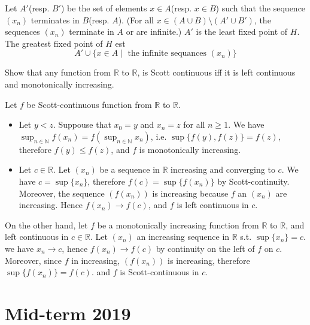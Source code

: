 \documentclass[a4paper,11pt]{exam}
\newcommand{\N}{\mathbb{N}}
\newcommand{\R}{\mathbb{R}}
\begin{document}
\begin{questions}
\begin{solution}
			Let $A'$(resp.  $B'$) be the set of elements $x\in A$(resp.  $x\in B$) such that the sequence $(x_n)$ terminates in $B$(resp.  $A$). 
			(For all $x \in (A \cup B) \setminus (A' \cup B')$, the sequences $(x_n)$
			terminate in $A$ or are infinite.)
			$A'$ is the least fixed point of $H$.
			The greatest fixed point of $H$ est
			\[
			A' \cup \{ x \in A \mid \text{ the
				infinite sequances $(x_n)$}  \}
			\]
		\end{solution}
		
		
		\question
		Show that any function from $\R$ to $\R$, is Scott continuous iff it is left continuous and monotonically increasing.
		\begin{solution}
			Let $f$ be Scott-continuous function from $\R$ to $\R$.
			\begin{itemize}
				\item Let $y<z$. Suppouse that $x_0=y$ and $x_n=z$ for all $n \geq  1$.
				We have $\sup_{n \in \N}f(x_n) = f(\sup_{n \in\N}x_n)$, i.e. $\sup\{f(y),f(z)\} = f(z)$, therefore $f(y) \leq f(z)$, and	$f$ is monotonically increasing.
				\item Let $c\in\R$. Let $(x_n)$ be a sequence in $\R$ increasing and converging to $c$.
				We have $c = \sup \{ x_n \}$, therefore $f(c) = \sup \{ f(x_n) \}$ by Scott-continuity.
				Moreover, the sequence $(f(x_n))$ is increasing because $f$ an $(x_n)$ are increasing. 
				Hence $f(x_n) \rightarrow f(c)$, and $f$ is left continuous in $c$.
			\end{itemize}
			
			On the other hand, let $f$ be a monotonically increasing function from $\R$ to $\R$, and left continuous in $c\in\R$.
			Let $(x_n)$ an increasing sequence in  $\R$ s.t. $\sup \{ x_n \} = c$.
			we have $x_n \rightarrow c$, hence $f(x_n) \rightarrow f(c)$ by continuity on the left of $f$ on $c$.
			Moreover, since $f$ in increasing, $(f(x_n))$ is increasing, therefore $\sup \{ f(x_n) \} = f(c)$.
			and $f$ is Scott-continuous in $c$.
		\end{solution}
		\section{Mid-term 2019}	
		

\end{questions}
\end{document}
